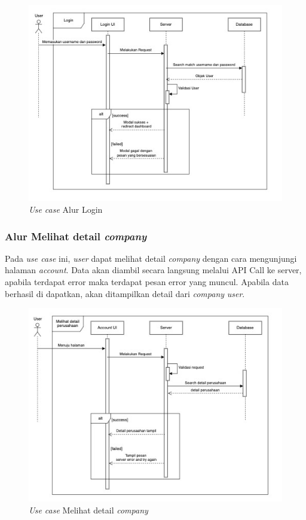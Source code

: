 \begin{figure}[h]
  \centering
  \includegraphics[width=1\textwidth]{resources/chapter-3/usecase/uc-05.jpg}
  \caption{\textit{Use case} Alur Login}
  \label{fig:usecase-05}
\end{figure}

\subsubsection{Alur Melihat detail \textit{company}}

Pada \textit{use case} ini, \textit{user} dapat melihat detail \textit{company} dengan cara mengunjungi halaman \textit{account}. Data akan diambil secara langsung melalui API Call ke server, apabila terdapat error maka terdapat pesan error yang muncul. Apabila data berhasil di dapatkan, akan ditampilkan detail dari \textit{company} \textit{user}.

\begin{figure}[h]
  \centering
  \includegraphics[width=1\textwidth]{resources/chapter-3/usecase/uc-06.jpg}
  \caption{\textit{Use case} Melihat detail \textit{company}}
  \label{fig:usecase-06}
\end{figure}

